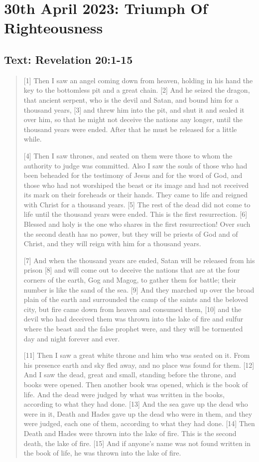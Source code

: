 \setcounter{figure}{0}

\section{30th April 2023: Triumph Of Righteousness}
\subsection*{Text: Revelation 20:1-15}
  \begin{quote}
  [1] Then I saw an angel coming down from heaven, holding in his hand the key to the bottomless pit and a great chain. [2] And he seized the dragon, that ancient serpent, who is the devil and Satan, and bound him for a thousand years, [3] and threw him into the pit, and shut it and sealed it over him, so that he might not deceive the nations any longer, until the thousand years were ended. After that he must be released for a little while.

  [4] Then I saw thrones, and seated on them were those to whom the authority to judge was committed. Also I saw the souls of those who had been beheaded for the testimony of Jesus and for the word of God, and those who had not worshiped the beast or its image and had not received its mark on their foreheads or their hands. They came to life and reigned with Christ for a thousand years. [5] The rest of the dead did not come to life until the thousand years were ended. This is the first resurrection. [6] Blessed and holy is the one who shares in the first resurrection! Over such the second death has no power, but they will be priests of God and of Christ, and they will reign with him for a thousand years.

  [7] And when the thousand years are ended, Satan will be released from his prison [8] and will come out to deceive the nations that are at the four corners of the earth, Gog and Magog, to gather them for battle; their number is like the sand of the sea. [9] And they marched up over the broad plain of the earth and surrounded the camp of the saints and the beloved city, but fire came down from heaven and consumed them, [10] and the devil who had deceived them was thrown into the lake of fire and sulfur where the beast and the false prophet were, and they will be tormented day and night forever and ever.

  [11] Then I saw a great white throne and him who was seated on it. From his presence earth and sky fled away, and no place was found for them. [12] And I saw the dead, great and small, standing before the throne, and books were opened. Then another book was opened, which is the book of life. And the dead were judged by what was written in the books, according to what they had done. [13] And the sea gave up the dead who were in it, Death and Hades gave up the dead who were in them, and they were judged, each one of them, according to what they had done. [14] Then Death and Hades were thrown into the lake of fire. This is the second death, the lake of fire. [15] And if anyone’s name was not found written in the book of life, he was thrown into the lake of fire.
  \end{quote}
